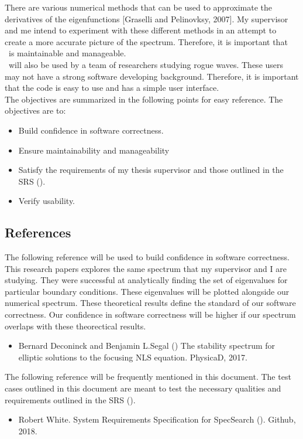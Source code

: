 \documentclass[12pt, titlepage]{article}
\begin{document}
	There are various numerical methods that can be used to approximate the 
	derivatives of the eigenfunctions [Graselli and Pelinovksy, 2007]. My 
	supervisor and me intend to experiment with these different 
	methods in an attempt to create a more accurate picture of the spectrum. 
	Therefore, it is important that \progname \ is maintainable and 
	manageable. \\
	
	 \progname \ will also be used by a team of researchers studying rogue 
	 waves. These users may not have a strong software 
	 developing background. Therefore, it is important that the code is easy to 
	 use and has a simple user interface. \\
	 
	 The objectives are summarized in the following points for easy reference. 
	 The objectives are to:
	
\begin{itemize}
	\item Build confidence in software correctness.
	\item Ensure maintainability and manageability 
	\item Satisfy the requirements of my thesis supervisor and those outlined 
	in the SRS (\cite{SRS}). 
	\item Verify usability.	
\end{itemize}

\subsection{References}
\label{REF1}
The following reference will be used to build confidence in software 
correctness. This research papers explores the same spectrum that my supervisor 
and I are studying. They were successful at analytically finding the set of 
eigenvalues for particular boundary conditions. These eigenvalues will be 
plotted alongside our numerical spectrum. These theoretical results define the 
standard of our software correctness. Our confidence in software correctness 
will be higher if our spectrum overlaps with these theorectical results. 
\begin{itemize} 
	\item 	Bernard Deconinck and Benjamin L.Segal (\cite{SegaletAl}) 
	The stability spectrum for elliptic solutions to the focusing NLS equation. 
	PhysicaD, 2017.  
\end{itemize} 
The following reference will be frequently mentioned in this document. The 
test cases outlined in this document are meant to test the necessary qualities 
and requirements outlined in the SRS (\cite{SRS}). 
\begin{itemize}
	\item Robert White. System Requirements Specification for SpecSearch 
	(\cite{SRS}). 
	Github, 2018. 
\end{itemize}  
\end{document}
